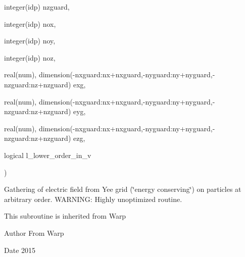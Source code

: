 {\begin{DoxyParamCaption}
\item[{integer(idp)}]{nzguard, }
\item[{integer(idp)}]{nox, }
\item[{integer(idp)}]{noy, }
\item[{integer(idp)}]{noz, }
\item[{real(num), dimension(-\/nxguard\+:nx+nxguard,-\/nyguard\+:ny+nyguard,-\/nzguard\+:nz+nzguard)}]{exg, }
\item[{real(num), dimension(-\/nxguard\+:nx+nxguard,-\/nyguard\+:ny+nyguard,-\/nzguard\+:nz+nzguard)}]{eyg, }
\item[{real(num), dimension(-\/nxguard\+:nx+nxguard,-\/nyguard\+:ny+nyguard,-\/nzguard\+:nz+nzguard)}]{ezg, }
\item[{logical}]{l\+\_\+lower\+\_\+order\+\_\+in\+\_\+v}
\end{DoxyParamCaption}
)}\hypertarget{field__gathering_8_f90_aff764c0eb8ae48e31d7bb6f39467cabf}{}\label{field__gathering_8_f90_aff764c0eb8ae48e31d7bb6f39467cabf}


Gathering of electric field from Yee grid (\char`\"{}energy conserving\char`\"{}) on particles at arbitrary order. W\+A\+R\+N\+I\+NG\+: Highly unoptimized routine. 

This subroutine is inherited from Warp \begin{DoxyAuthor}{Author}
From Warp 
\end{DoxyAuthor}
\begin{DoxyDate}{Date}
2015 
\end{DoxyDate}
